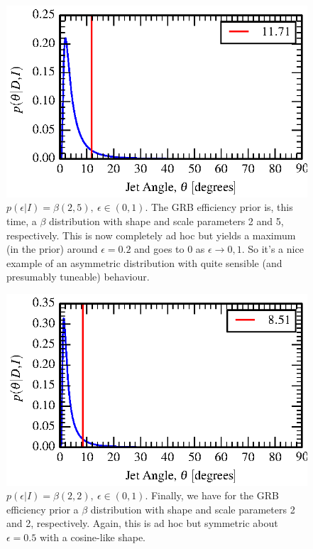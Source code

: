 \documentclass[twocolumn,nofootinbib]{revtex4-1}
\begin{document}
\begin{figure}[h!]
\includegraphics{iLIGO/jet_angle_posterior_s6UL_TEST_betaEffPrior-2-5.eps}
\caption{$p(\epsilon|I) = \beta(2,5),~\epsilon \in (0,1)$.  The GRB efficiency
prior is, this time, a $\beta$ distribution with shape and scale parameters 2
and 5, respectively.  This is now completely ad hoc but yields a maximum (in the
prior) around $\epsilon=0.2$ and goes to 0 as $\epsilon \rightarrow 0,1$.  So
it's a nice example of an asymmetric distribution with quite sensible (and
presumably tuneable) behaviour.}
\end{figure}

\begin{figure}[h!]
\includegraphics{iLIGO/jet_angle_posterior_s6UL_TEST_betaEffPrior-2-2.eps}
\caption{$p(\epsilon|I) = \beta(2,2),~\epsilon \in (0,1)$.  Finally, we have for
the GRB efficiency prior a $\beta$ distribution with shape and scale parameters 2
and 2, respectively.  Again, this is ad hoc but symmetric about $\epsilon=0.5$
with a cosine-like shape.}
\end{figure}
\end{document}
